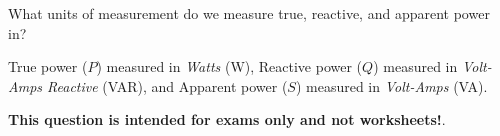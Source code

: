 

What units of measurement do we measure true, reactive, and apparent power in?







True power ($P$) measured in {\it Watts} (W), Reactive power ($Q$) measured in {\it Volt-Amps Reactive} (VAR), and Apparent power ($S$) measured in {\it Volt-Amps} (VA).







{\bf This question is intended for exams only and not worksheets!}.



